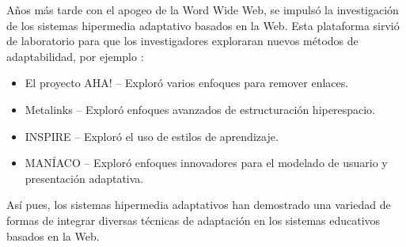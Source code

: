 Años más tarde con el apogeo de la Word Wide Web, se impulsó la investigación de los sistemas hipermedia adaptativo basados en la Web. Esta plataforma sirvió de laboratorio para que los investigadores exploraran nuevos métodos de adaptabilidad, por ejemplo \cite{Brusilovsky1999}:
\begin{itemize}
    \item El proyecto AHA! – Exploró varios enfoques para remover enlaces.
    \item	Metalinks – Exploró enfoques avanzados de estructuración hiperespacio.
    \item	INSPIRE – Exploró el uso de estilos de aprendizaje.
    \item	MANÍACO – Exploró enfoques innovadores para el modelado de usuario y presentación adaptativa. 
\end{itemize}

Así pues, los sistemas hipermedia adaptativos han demostrado una variedad de formas de integrar diversas técnicas de adaptación en los sistemas educativos basados en la Web. 
